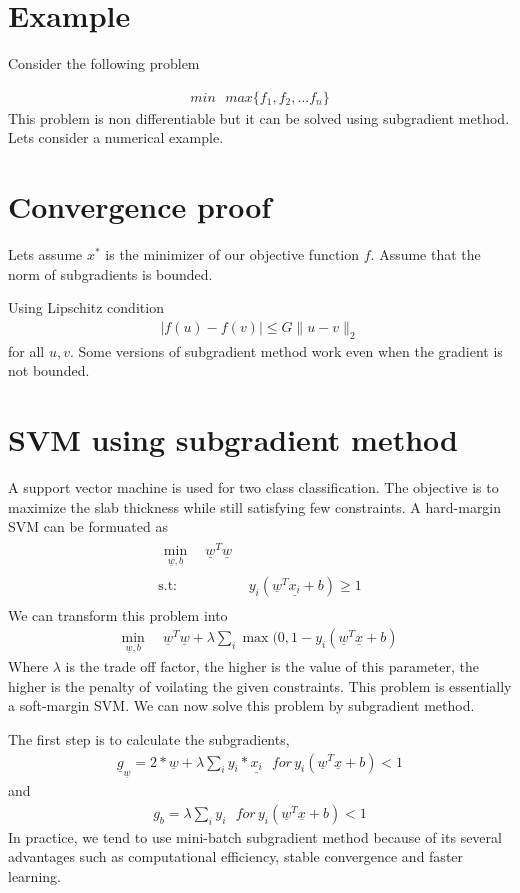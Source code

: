 \documentclass[twoside,twocolumn]{article}
\renewcommand{\vec}[1]{\underline{#1}}
\newcommand\twospace{\,\,}
\newcommand\fourspace{\,\,\,\,}
\newcommand\norm[1]{\ensuremath{\lVert#1\rVert_2}}
\begin{document}
\section{Example}
Consider the following problem

\begin{align}
    min\fourspace max\{f_1,f_2,\dots f_n\}
\end{align}
This problem is non differentiable but it can be solved using subgradient method. Lets consider a numerical example.

\section{Convergence proof}
Lets assume $x^*$ is the minimizer of our objective function $f$. Assume that the norm of subgradients is bounded.

Using Lipschitz condition
\begin{align}
    \left| f(u)-f(v)\right| \leq G\norm{u-v}
\end{align}
for all $u,v$. Some versions of subgradient method work even when the gradient is not bounded. 

\section{SVM using subgradient method}
A support vector machine is used for two class classification. The objective is to maximize the slab thickness while still satisfying  few constraints. A hard-margin SVM can be formuated as
\begin{align}
    \begin{split}
        \min_{\vec{w},b}\, &\twospace\vec{w}^T\vec{w}
    \end{split}\\ 
    \text{s.t:}
    \twospace & y_i(\vec{w}^T\vec{x_i}+b)\geq 1\\
\end{align}
We can transform this problem into
\begin{align}
    \min_{\vec{w},b}\, &\twospace\vec{w}^T\vec{w} + \lambda \sum_i \max(0, 1-y_i\left(\vec{w}^T\vec{x}+b\right)
\end{align}
Where $\lambda$ is the trade off factor, the higher is the value of this parameter, the higher is the penalty of voilating the given constraints. This problem is essentially a soft-margin SVM. We can now solve this problem by subgradient method.

The first step is to calculate the subgradients, 
\begin{align}
    \vec{g}_{\vec{w}} = 2*\vec{w}+\lambda\displaystyle\sum_i y_i*\vec{x_i} \fourspace for\,  y_i\left(\vec{w}^T\vec{x}+b\right) < 1
\end{align}
and
\begin{align}
    g_{b} = \lambda\displaystyle\sum_i y_i \fourspace for\,  y_i\left(\vec{w}^T\vec{x}+b\right) < 1
\end{align}
In practice, we tend to use mini-batch subgradient method because of its several advantages such as computational efficiency, stable convergence and faster learning.
\end{document}
